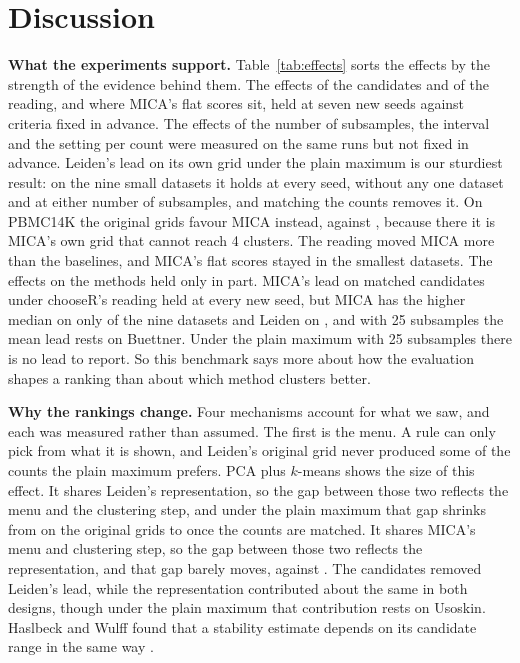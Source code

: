\section{Discussion}\label{sec:discussion}


\textbf{What the experiments support.} Table~\ref{tab:effects} sorts the effects by the strength of the
evidence behind them. The effects of the candidates and of the reading, and where MICA's flat scores sit,
held at seven new seeds against criteria fixed in advance. The effects of the number of subsamples, the
interval and the setting per count were measured on the same runs but not fixed in advance. Leiden's lead
on its own grid under the plain maximum is our sturdiest result: on the nine small datasets it holds at
every seed, without any one dataset and at either number of subsamples, and matching the counts removes
it. On
PBMC14K the original grids favour MICA instead,  against
, because there it is MICA's own grid that cannot reach 4 clusters. The
reading moved MICA more than the baselines, and MICA's flat scores stayed in the smallest datasets. The
effects on the methods held only in part. MICA's lead on matched candidates under chooseR's reading held at
every new seed, but MICA has the higher median on only  of the nine datasets and
Leiden on , and with 25 subsamples the mean lead rests on Buettner. Under the
plain maximum with 25 subsamples there is no lead to report. So this benchmark says more about
how the evaluation shapes a ranking than about which method clusters better.

\textbf{Why the rankings change.} Four mechanisms account for what we saw, and each was measured rather
than assumed. The first is the menu. A rule can only pick from what it is shown, and Leiden's original
grid never produced some of the counts the plain maximum prefers. PCA plus $k$-means shows the size of
this effect. It shares Leiden's representation, so the gap between those two reflects the menu and the
clustering step, and under the plain maximum that gap shrinks from  on
the original grids to  once the counts are matched. It shares MICA's menu
and clustering step, so the gap between those two reflects the representation, and that gap barely
moves,  against . The candidates removed
Leiden's lead, while the representation contributed about the same in both designs, though
under the plain maximum that contribution rests on Usoskin. Haslbeck and Wulff found that a stability
estimate depends on its candidate range in the same way \cite{Haslbeck2020Corrected}.

